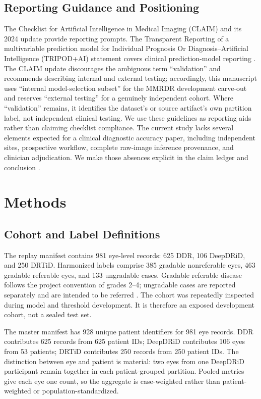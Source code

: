 \documentclass{ieeeaccess}
\begin{document}
\subsection{Reporting Guidance and Positioning}
The Checklist for Artificial Intelligence in Medical Imaging (CLAIM) and its 2024 update provide reporting prompts. The Transparent Reporting of a multivariable prediction model for Individual Prognosis Or Diagnosis--Artificial Intelligence (TRIPOD+AI) statement covers clinical prediction-model reporting \cite{claim,claim2024,tripodai}. The CLAIM update discourages the ambiguous term ``validation'' and recommends describing internal and external testing; accordingly, this manuscript uses ``internal model-selection subset'' for the MMRDR development carve-out and reserves ``external testing'' for a genuinely independent cohort. Where ``validation'' remains, it identifies the dataset's or source artifact's own partition label, not independent clinical testing. We use these guidelines as reporting aids rather than claiming checklist compliance. The current study lacks several elements expected for a clinical diagnostic accuracy paper, including independent sites, prospective workflow, complete raw-image inference provenance, and clinician adjudication. We make those absences explicit in the claim ledger and conclusion \cite{openaiChatGPT}.

\section{Methods}
\subsection{Cohort and Label Definitions}
The replay manifest contains 981 eye-level records: 625 DDR, 106 DeepDRiD, and 250 DRTiD. Harmonized labels comprise 385 gradable nonreferable eyes, 463 gradable referable eyes, and 133 ungradable cases. Gradable referable disease follows the project convention of grades 2--4; ungradable cases are reported separately and are intended to be referred \cite{ddr,deepdrid,drtidpaper}. The cohort was repeatedly inspected during model and threshold development. It is therefore an exposed development cohort, not a sealed test set.

The master manifest has 928 unique patient identifiers for 981 eye records. DDR contributes 625 records from 625 patient IDs; DeepDRiD contributes 106 eyes from 53 patients; DRTiD contributes 250 records from 250 patient IDs. The distinction between eye and patient is material: two eyes from one DeepDRiD participant remain together in each patient-grouped partition. Pooled metrics give each eye one count, so the aggregate is case-weighted rather than patient-weighted or population-standardized.
\end{document}
